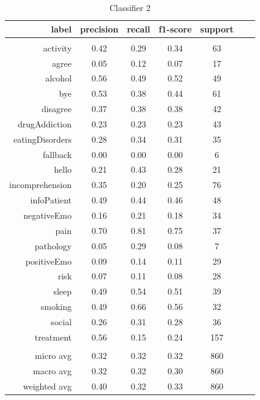 \documentclass[11pt]{article}
\begin{document}
\begin{table}[htb]
\begin{center}
\begin{tabular}{ |r|c|c|c|c|c|c| }
label  			&    precision  &  recall & f1-score &  support\\ \hline 
\\ \hline 
activity 		&  0.42 & 0.29 & 0.34 &   63\\ \hline 
agree 			&  0.05 & 0.12 & 0.07 &   17\\ \hline 
alcohol 		&  0.56 & 0.49 & 0.52 &   49\\ \hline 
bye 			&  0.53 & 0.38 & 0.44 &   61\\ \hline 
disagree 		&  0.37 & 0.38 & 0.38 &   42\\ \hline 
drugAddiction 	&  0.23 & 0.23 & 0.23 &   43\\ \hline 
eatingDisorders &  0.28 & 0.34 & 0.31 &   35\\ \hline 
fallback 		&  0.00 & 0.00 & 0.00 &    6\\ \hline 
hello 			&  0.21 & 0.43 & 0.28 &   21\\ \hline 
incomprehension &  0.35 & 0.20 & 0.25 &   76\\ \hline 
infoPatient 	&  0.49 & 0.44 & 0.46 &   48\\ \hline 
negativeEmo 	&  0.16 & 0.21 & 0.18 &   34\\ \hline 
pain 			&  0.70 & 0.81 & 0.75 &   37\\ \hline 
pathology 		&  0.05 & 0.29 & 0.08 &    7\\ \hline 
positiveEmo 	&  0.09 & 0.14 & 0.11 &   29\\ \hline 
risk 			&  0.07 & 0.11 & 0.08 &   28\\ \hline 
sleep 			&  0.49 & 0.54 & 0.51 &   39\\ \hline 
smoking 		&  0.49 & 0.66 & 0.56 &   32\\ \hline 
social 			&  0.26 & 0.31 & 0.28 &   36\\ \hline 
treatment 		&  0.56 & 0.15 & 0.24 &  157\\ \hline 
\\ \hline 
micro avg 		&  0.32 & 0.32 & 0.32 &  860\\ \hline 
macro avg 		&  0.32 & 0.32 & 0.30 &  860\\ \hline 
weighted avg 	&  0.40 & 0.32 & 0.33 &  860\\ \hline 
\end{tabular}
\caption{Classifier 2}
\end{center}
\end{table}
\FloatBarrier
\end{document}
